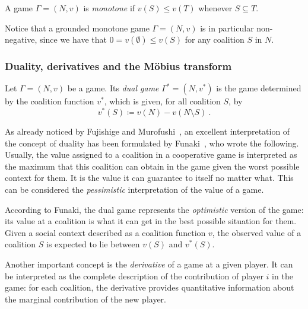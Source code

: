\documentclass[a4paper,12pt]{amsart}
\begin{document}
\begin{definition}
A game $\Gamma = (N, v)$ is \emph{monotone} if \(v(S) \leq v(T)\) whenever \(S \subseteq T\).
\end{definition}

\begin{remark}
Notice that a grounded monotone game $\Gamma = (N, v)$ is in particular non-negative, since we have that $0 = v(\emptyset) \leq v(S)$ for any coalition $S$ in $N$.
\end{remark}


\subsubsection{Duality, derivatives and the Möbius transform}\label{Subsubsection: duality and derivatives}

\begin{definition}\label{definition: dual game}
Let $\Gamma = (N, v)$ be a game. Its \textit{dual game} $\Gamma^* = (N, v^*)$ is the game determined by the coalition function $v^*$, which is given, for all coalition \(S\), by
\[
v^*(S) \coloneqq v(N) - v(N \setminus S)~.
\]
\end{definition}

\begin{remark}
As already noticed by Fujishige and Murofushi~\cite{fujimoto2007some}, an excellent interpretation of the concept of duality has been formulated by Funaki~\cite{funaki1998dual}, who wrote the following. Usually, the value assigned to a coalition in a cooperative game is interpreted as the maximum that this coalition can obtain in the game given the worst possible context for them. It is the value it can guarantee to itself no matter what. This can be considered the  \emph{pessimistic} interpretation of the value of a game. 

\medskip

According to Funaki, the dual game represents the \emph{optimistic} version of the game: its value at a coalition is what it can get in the best possible situation for them. Given a social context described as a coalition function $v$, the observed value of a coalition $S$ is expected to lie between \(v(S)\) and \(v^*(S)\). 
\end{remark}

Another important concept is the \textit{derivative} of a game at a given player. It can be interpreted as the complete description of the contribution of player $i$ in the game: for each coalition, the derivative provides quantitative information about the marginal contribution of the new player. 
\end{document}
